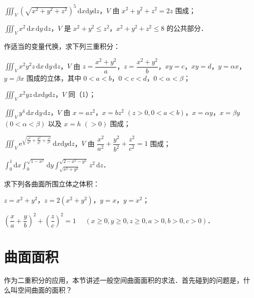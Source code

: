 \begin{xiti}
\begin{ziti}
\item $\displaystyle\iiint_{V}\left(\sqrt{x^{2}+y^{2}+z^{2}}\right)^{5}\,\mathrm{d}x\mathrm{d}y\mathrm{d}z$，$V$ 由 $x^{2}+y^{2}+z^{2}=2z$ 围成；
\item $\displaystyle\iiint_{V}x^{2}\,\mathrm{d}x\,\mathrm{d}y\,\mathrm{d}z$，$V$ 是 $x^{2}+y^{2}\leqslant z^{2}$，$x^{2}+y^{2}+z^{2}\leqslant 8$ 的公共部分．
\end{ziti}
\item 作适当的变量代换，求下列三重积分：
\begin{ziti}
\item $\displaystyle\iiint_{V}x^{2}y^{2}z\,\mathrm{d}x\,\mathrm{d}y\,\mathrm{d}z$，$V$ 由 $z=\dfrac{x^{2}+y^{2}}{a}$，$z=\dfrac{x^{2}+y^{2}}{b}$，$xy=c$，$xy=d$，$y=\alpha x$，$y=\beta x$ 围成的立体，其中 $0<a<b$，$0<c<d$，$0<\alpha<\beta$；
\item $\displaystyle\iiint_{V}x^{2}yz\,\mathrm{d}x\mathrm{d}y\mathrm{d}z$，$V$ 同（1）；
\item $\displaystyle\iiint_{V}y^{4}\,\mathrm{d}x\,\mathrm{d}y\,\mathrm{d}z$，$V$ 由 $x=az^{2}$，$x=bz^{2}$ $(z>0,0<a<b)$，$x=\alpha y$，$x=\beta y$ $(0<\alpha<\beta)$ 以及 $x=h$ $(>0)$ 围成；
\item $\displaystyle\iiint_{V}\mathrm{e}^{\sqrt{\frac{x^{2}}{a^{2}}+\frac{y^{2}}{b^{2}}+\frac{z^{2}}{c^{2}}}}\,\mathrm{d}x\mathrm{d}y\mathrm{d}z$，$V$ 由 $\dfrac{x^{2}}{a^{2}}+\dfrac{y^{2}}{b^{2}}+\dfrac{z^{2}}{c^{2}}=1$ 围成；
\item $\displaystyle\int_{0}^{1}\mathrm{d}x\int_{0}^{\sqrt{1-x^{2}}}\mathrm{d}y\int_{\sqrt{x^{2}+y^{2}}}^{\sqrt{2-x^{2}-y^{2}}}z^{2}\,\mathrm{d}z$．
\end{ziti}
\item 求下列各曲面所围立体之体积：
\begin{ziti}
\item $z=x^{2}+y^{2}$，$z=2(x^{2}+y^{2})$，$y=x$，$y=x^{2}$；
\item $\left(\dfrac{x}{a}+\dfrac{y}{b}\right)^{2}+\left(\dfrac{z}{c}\right)^{2}=1$ $\quad(x\geqslant 0,y\geqslant 0,z\geqslant 0,a>0,b>0,c>0)$．
\end{ziti}
\end{xiti}

\section{曲面面积}\label{sec:20-4}

作为二重积分的应用，本节讲述一般空间曲面面积的求法．首先碰到的问题是，什么叫空间曲面的面积？

